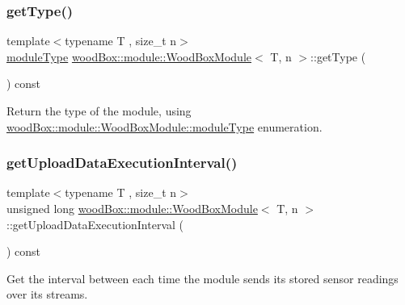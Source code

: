 \subsubsection{\texorpdfstring{get\+Type()}{getType()}}
{\footnotesize\ttfamily template$<$typename T , size\+\_\+t n$>$ \\
\mbox{\hyperlink{classwood_box_1_1module_1_1_wood_box_module_af74476c8a785de7fe587c4fb68435673}{module\+Type}} \mbox{\hyperlink{classwood_box_1_1module_1_1_wood_box_module}{wood\+Box\+::module\+::\+Wood\+Box\+Module}}$<$ T, n $>$\+::get\+Type (\begin{DoxyParamCaption}{ }\end{DoxyParamCaption}) const\hspace{0.3cm}{\ttfamily [inline]}}

Return the type of the module, using \mbox{\hyperlink{classwood_box_1_1module_1_1_wood_box_module_af74476c8a785de7fe587c4fb68435673}{wood\+Box\+::module\+::\+Wood\+Box\+Module\+::module\+Type}} enumeration. \mbox{\label{classwood_box_1_1module_1_1_wood_box_module_a9582f3340d1aa35abfe278dec41f4313}} 
\subsubsection{\texorpdfstring{get\+Upload\+Data\+Execution\+Interval()}{getUploadDataExecutionInterval()}}
{\footnotesize\ttfamily template$<$typename T , size\+\_\+t n$>$ \\
unsigned long \mbox{\hyperlink{classwood_box_1_1module_1_1_wood_box_module}{wood\+Box\+::module\+::\+Wood\+Box\+Module}}$<$ T, n $>$\+::get\+Upload\+Data\+Execution\+Interval (\begin{DoxyParamCaption}{ }\end{DoxyParamCaption}) const\hspace{0.3cm}{\ttfamily [inline]}}

Get the interval between each time the module sends its stored sensor readings over its streams. \mbox{\label{classwood_box_1_1module_1_1_wood_box_module_a2d3f18ce3df3d5fe3b6230fce2199958}} 
